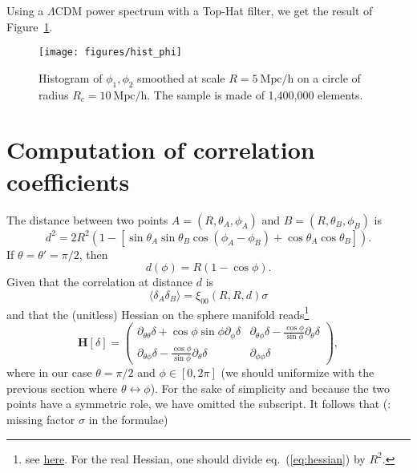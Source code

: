 \documentclass[useAMS,usenatbib,babel,superscriptaddress]{mnras}
\newcommand{\SI}[2]{\ensuremath{#1~\mathrm{#2}}}
\newcommand{\mean}[1]{
  \langle #1
  \rangle}
\def\red{\color{Red}}
\newcommand{\TODO}[1]{{\red{\bf TODO}: #1}}
\begin{document}
Using a $\Lambda$CDM power spectrum with a Top-Hat filter, we get the result of Figure~\ref{fig:distrib_phi}.
\begin{figure}
  \centering
  \texttt{[image: figures/hist\_phi]}
  \caption{Histogram of $\phi_1,\phi_2$ smoothed at scale $R=\SI{5}{Mpc/h}$ on a circle of radius $R_c=\SI{10}{Mpc/h}$. The sample is made of 1,400,000 elements.}
  \label{fig:distrib_phi}
\end{figure}


\appendix

\section{Computation of correlation coefficients}

The distance between two points $A = (R, \theta_A, \phi_A)$ and $B = (R, \theta_B, \phi_B)$ is
\begin{equation}
  d^2 = 2R^2\left(1-\left[{\sin\theta_A\sin\theta_B}{\cos(\phi_A-\phi_B)}+\cos\theta_A\cos\theta_B\right]\right).
\end{equation}
If $\theta=\theta'=\pi/2$, then
\begin{equation}
  d(\phi) = R(1-\cos\phi).
\end{equation}
Given that the correlation at distance $d$ is
\begin{equation}
  \mean{\delta_A\delta_B} = \xi_{00}(R, R, d) \sigma
\end{equation}
and that the (unitless) Hessian on the sphere manifold reads\footnote{see \href{https://math.stackexchange.com/questions/2036124/hessian-matrix-in-spherical-coordinates}{here}. For the real Hessian, one should divide eq.~(\ref{eq:hessian}) by $R^2$.}
\begin{equation}
  \label{eq:hessian}
  \mathbf{H}[\delta] =
  \begin{pmatrix}
    \partial_{\theta\theta}\delta + \cos\phi\sin\phi\partial_\phi \delta & \partial_{\theta\phi}\delta - \frac{\cos\phi}{\sin\phi}\partial_\theta\delta \\
    \partial_{\theta\phi}\delta - \frac{\cos\phi}{\sin\phi}\partial_\theta\delta & \partial_{\phi\phi}\delta
  \end{pmatrix},
\end{equation}
where in our case $\theta =\pi/2$ and $\phi\in[0, 2\pi]$ (we should uniformize with the previous section where $\theta\leftrightarrow\phi$). For the sake of simplicity and because the two points have a symmetric role, we have omitted the subscript. It follows that (\TODO{missing factor $\sigma$ in the formulae})
\end{document}
